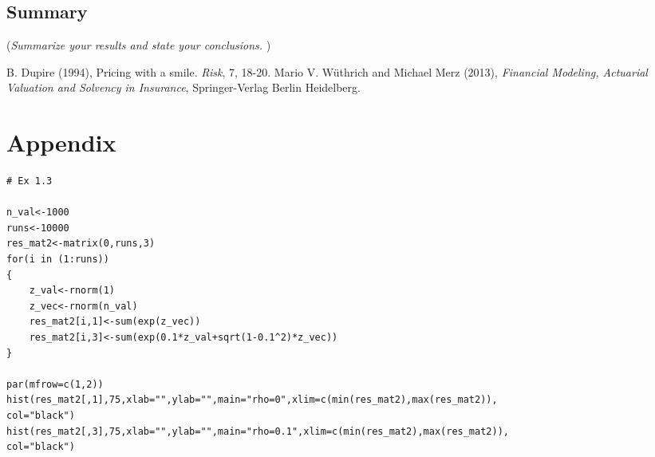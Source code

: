 \documentclass[a4paper]{article}
\begin{document}
\subsection*{Summary}
({\it Summarize your results and state your conclusions. })



\begin{thebibliography}{99}
B. Dupire (1994),
Pricing with a smile.
\emph{Risk}, 7, 18-20.
  Mario V. W\"{u}thrich and Michael Merz (2013),
  \emph{Financial Modeling, Actuarial Valuation and Solvency in Insurance},
  Springer-Verlag Berlin Heidelberg.
\end{thebibliography}


\section*{Appendix}

\begin{verbatim}
# Ex 1.3

n_val<-1000
runs<-10000
res_mat2<-matrix(0,runs,3)
for(i in (1:runs))
{
	z_val<-rnorm(1)
	z_vec<-rnorm(n_val)
	res_mat2[i,1]<-sum(exp(z_vec))
	res_mat2[i,3]<-sum(exp(0.1*z_val+sqrt(1-0.1^2)*z_vec))
}

par(mfrow=c(1,2))
hist(res_mat2[,1],75,xlab="",ylab="",main="rho=0",xlim=c(min(res_mat2),max(res_mat2)),
col="black")
hist(res_mat2[,3],75,xlab="",ylab="",main="rho=0.1",xlim=c(min(res_mat2),max(res_mat2)),
col="black")
\end{verbatim}
\end{document}
